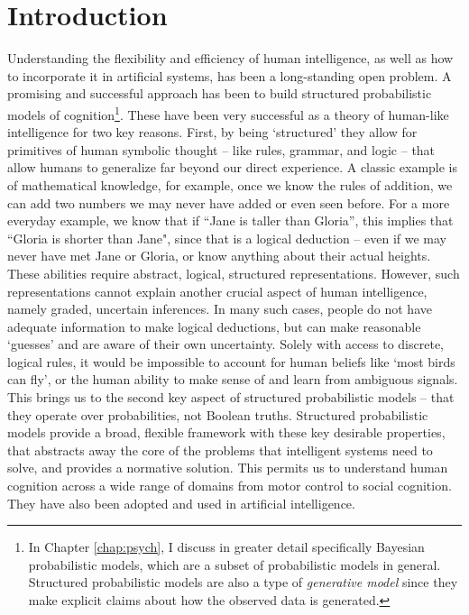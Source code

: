 \chapter{Introduction}
\label{chap:intro}

Understanding the flexibility and efficiency of human intelligence, as well as how to incorporate it in artificial systems, has been a long-standing open problem. A promising and successful approach has been to build structured probabilistic models of cognition\footnote{In Chapter \ref{chap:psych}, I discuss in greater detail specifically Bayesian probabilistic models, which are a subset of probabilistic models in general. Structured probabilistic models are also a type of \textit{generative model} since they make explicit claims about how the observed data is generated.}. These have been very successful as a theory of human-like intelligence for two key reasons. First, by being `structured' they allow for primitives of human symbolic thought -- like rules, grammar, and logic -- that allow humans to generalize far beyond our direct experience. \cite{fodor88, chomsky2002syntactic} A classic example is of mathematical knowledge, for example, once we know the rules of addition, we can add two numbers we may never have added or even seen before. For a more everyday example, we know that if ``Jane is taller than Gloria'', this implies that ``Gloria is shorter than Jane", since that is a logical deduction -- even if we may never have met Jane or Gloria, or know anything about their actual heights. These abilities require abstract, logical, structured representations. However, such representations cannot explain another crucial aspect of human intelligence, namely graded, uncertain inferences.\cite{rogers2004semantic} In many such cases, people do not have adequate information to make logical deductions, but can make reasonable `guesses' and are aware of their own uncertainty. Solely with access to discrete, logical rules, it would be impossible to account for human beliefs like `most birds can fly', or the human ability to make sense of and learn from ambiguous signals. This brings us to the second key aspect of structured probabilistic models -- that they operate over probabilities, not Boolean truths. Structured probabilistic models provide a broad, flexible framework with these key desirable properties, that abstracts away the core of the problems that intelligent systems need to solve, and provides a normative solution. This permits us to understand human cognition across a wide range of domains\citep{griffiths2008bayesian} from motor control\citep{kording2006bayesian} to social cognition\citep{baker2007goal}. They have also been adopted and used in artificial intelligence\cite{lake2015human, del2013understanding, zhao2011image, steyvers2007probabilistic}.

